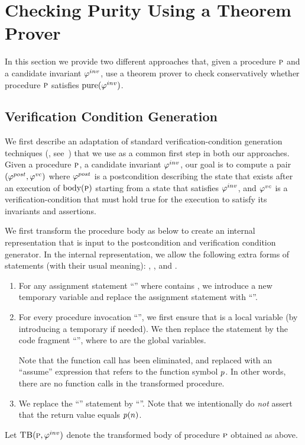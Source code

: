 \newcommand{\existformula}{\psi^e}
\newcommand{\EA}{\textsc{ea}}
\newcommand{\IW}{\textsc{iw}}

\newcommand{\initformula}{\logicalformula{init}}

\section{Checking Purity Using a Theorem Prover}
\label{sec:vcgen}

In this section we provide two different approaches that, given a procedure
$\textsc{p}$ and a candidate invariant $\varphi^{inv}$, use a theorem prover to check
conservatively whether procedure $\textsc{p}$ satisfies $\mathrm{pure}(\varphi^{inv})$.

\subsection{Verification Condition Generation}

We first describe an adaptation of standard verification-condition generation
techniques (\eg, see~\cite{cormac:popl01}) that we use as a common first step in both our approaches.
Given a procedure $\textsc{p}$, a candidate invariant $\varphi^{inv}$, our goal is to compute a
pair $(\varphi^{post},\varphi^{vc})$ where $\varphi^{post}$ is a postcondition describing the state that exists after an execution of
$\text{body}(\textsc{p})$ starting from a state that satisfies $\varphi^{inv}$, and $\varphi^{vc}$ is a verification-condition that must hold true
for the execution to satisfy its invariants and assertions.

We first transform the procedure body as below to create an internal representation that is input to the
postcondition and verification condition generator. In the internal representation, we allow the following
extra forms of statements (with their usual meaning): , , and  .
\begin{enumerate}
\item For any assignment statement ``'' where  contains , we introduce a new temporary
variable  and replace the assignment statement with ``''.
\item For every procedure invocation ``'', we first ensure that  is a local variable (by introducing
a temporary if needed). We then replace the statement by the code fragment
``'',
where  to  are the global variables.

Note that the
function call has been eliminated, and replaced with an ``assume''
expression that refers to the function symbol $p$. In other words,
there are no function calls in the transformed procedure.
\item We replace the ``'' statement by ``''.
Note that we intentionally do \emph{not} assert that the return value equals $p(n)$.
\end{enumerate}
Let $\textsc{TB}(\textsc{p}, \varphi^{inv})$ denote the transformed body of procedure $\textsc{p}$ obtained as above.

